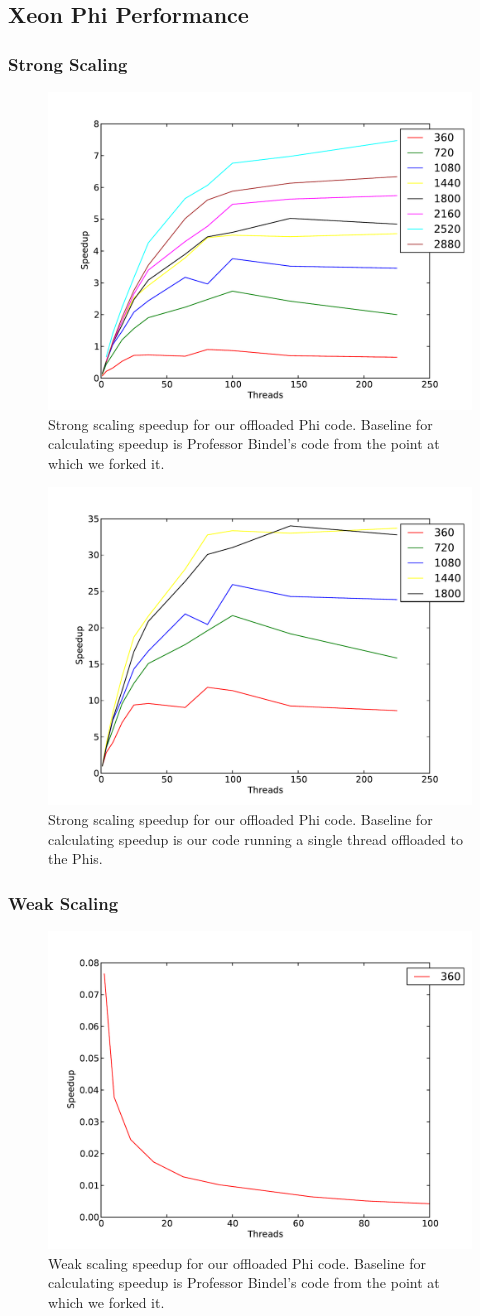 \documentclass[11pt]{article}
\begin{document}
\subsection{Xeon Phi Performance}

\subsubsection{Strong Scaling}
\begin{figure}[h!]
\includegraphics[width=0.5\linewidth]{mic_strong_bindel_baseline.pdf}
\caption{Strong scaling speedup for our offloaded Phi code. Baseline for calculating speedup is Professor Bindel's code from the point at which we forked it.}
\end{figure}

\begin{figure}[h!]
\includegraphics[width=0.5\linewidth]{mic_strong_mic_baseline.pdf}
\caption{Strong scaling speedup for our offloaded Phi code. Baseline for calculating speedup is our code running a single thread offloaded to the Phis.}
\end{figure}

\subsubsection{Weak Scaling}
\begin{figure}[h!]
\includegraphics[width=0.5\linewidth]{mic_weak_bindel_baseline.pdf}
\caption{Weak scaling speedup for our offloaded Phi code. Baseline for calculating speedup is Professor Bindel's code from the point at which we forked it.}
\end{figure}
\end{document}
